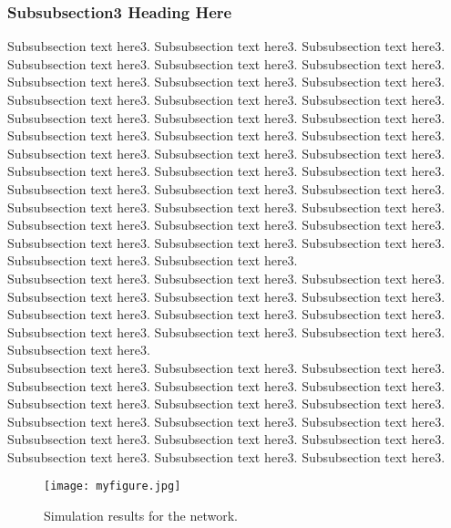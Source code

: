 \documentclass[journal]{IEEEtran}
\begin{document}
\subsubsection{Subsubsection3 Heading Here}
Subsubsection text here3.
Subsubsection text here3.
Subsubsection text here3.
Subsubsection text here3.
Subsubsection text here3.
Subsubsection text here3.
Subsubsection text here3.
Subsubsection text here3.
Subsubsection text here3.
Subsubsection text here3.
Subsubsection text here3.
Subsubsection text here3.
Subsubsection text here3.
Subsubsection text here3.
Subsubsection text here3.
Subsubsection text here3.
Subsubsection text here3.
Subsubsection text here3.
Subsubsection text here3.
Subsubsection text here3.
Subsubsection text here3.
Subsubsection text here3.
Subsubsection text here3.
Subsubsection text here3.
Subsubsection text here3.
Subsubsection text here3.
Subsubsection text here3.
Subsubsection text here3.
Subsubsection text here3.
Subsubsection text here3.
Subsubsection text here3.
Subsubsection text here3.
Subsubsection text here3.
Subsubsection text here3.
Subsubsection text here3.
Subsubsection text here3.
Subsubsection text here3.
Subsubsection text here3.\\
Subsubsection text here3.
Subsubsection text here3.
Subsubsection text here3.
Subsubsection text here3.
Subsubsection text here3.
Subsubsection text here3.
Subsubsection text here3.
Subsubsection text here3.
Subsubsection text here3.
Subsubsection text here3.
Subsubsection text here3.
Subsubsection text here3.
Subsubsection text here3.\\
Subsubsection text here3.
Subsubsection text here3.
Subsubsection text here3.
Subsubsection text here3.
Subsubsection text here3.
Subsubsection text here3.
Subsubsection text here3.
Subsubsection text here3.
Subsubsection text here3.
Subsubsection text here3.
Subsubsection text here3.
Subsubsection text here3.
Subsubsection text here3.
Subsubsection text here3.
Subsubsection text here3.
Subsubsection text here3.
Subsubsection text here3.
Subsubsection text here3.


%
%
\begin{figure}[!t]
\centering
\texttt{[image: myfigure.jpg]}
\caption{Simulation results for the network.}
\label{fig_sim}
\end{figure}
\end{document}
